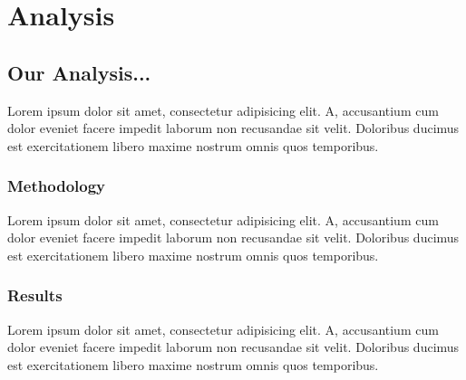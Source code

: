 \section{Analysis}

\subsection{Our Analysis...}

Lorem ipsum dolor sit amet, consectetur adipisicing elit.
A, accusantium cum dolor eveniet facere impedit laborum non recusandae sit velit. Doloribus ducimus est exercitationem libero maxime nostrum omnis quos temporibus.

\subsubsection{Methodology}

Lorem ipsum dolor sit amet, consectetur adipisicing elit. A, accusantium cum dolor eveniet facere impedit laborum non recusandae sit velit. Doloribus ducimus est exercitationem libero maxime nostrum omnis quos temporibus.

\subsubsection{Results}

Lorem ipsum dolor sit amet, consectetur adipisicing elit. A, accusantium cum dolor eveniet facere impedit laborum non recusandae sit velit. Doloribus ducimus est exercitationem libero maxime nostrum omnis quos temporibus.
